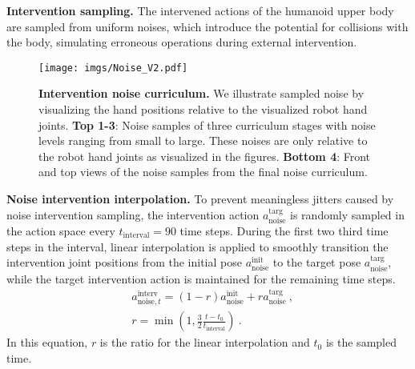 \noindent\textbf{Intervention sampling.}
The intervened actions of the humanoid upper body are sampled from uniform noises, which introduce the potential for collisions with the body, simulating erroneous operations during external intervention. 
\begin{figure}[t]
\centering
\texttt{[image: imgs/Noise\_V2.pdf]}
\vspace{-8pt}
\caption{\small \textbf{Intervention noise curriculum.} We illustrate sampled noise by visualizing the hand positions relative to the visualized robot hand joints. \textbf{Top 1-3}: Noise samples of three curriculum stages with noise levels ranging from small to large. These noises are only relative to the robot hand joints as visualized in the figures. \textbf{Bottom 4}: Front and top views of the noise samples from the final noise curriculum.}
\label{Fig: Noise}
\vspace{-10pt}
\end{figure}

\noindent\textbf{Noise intervention interpolation.}
To prevent meaningless jitters caused by noise intervention sampling, the intervention action $a_{\text{noise}}^{\text{targ}}$ is randomly sampled in the action space every $t_\text{interval} = 90$ time steps. 
During the first two third time steps in the interval, linear interpolation is applied to smoothly transition the intervention joint positions from the initial pose $a_{\text{noise}}^{\text{init}}$ to the target pose $a_{\text{noise}}^{\text{targ}}$, while the target intervention action is maintained for the remaining time steps.
\begin{equation}
    \begin{aligned}
        &a^{\text{interv}}_{\text{noise},t} = (1-r)a_{\text{noise}}^{\text{init}} + r a_{\text{noise}}^{\text{targ}} ~, \\
        &r = \min \left(1, \frac 3 2\frac{t-t_0}{t_{\text{interval}}} \right) ~.
    \end{aligned}
\end{equation}
In this equation, $r$ is the ratio for the linear interpolation and $t_0$ is the sampled time.

